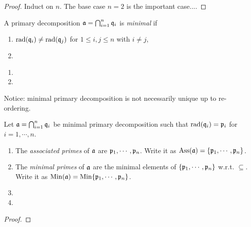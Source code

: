 \begin{proof}
    Induct on $n$. The base case $n = 2$ is the important case....
\end{proof}

\begin{definition}
    A primary decomposition $\mathfrak{a} = \bigcap_{i=1}^{n}\mathfrak{q}_i$ is \emph{minimal} if 
    \begin{enumerate}
        \item $\operatorname{rad}(\mathfrak{q}_i) \neq \operatorname{rad}(\mathfrak{q}_j)$ for $1 \leq i,j \leq n$ with $i \neq j$,
        \item 
    \end{enumerate}
\end{definition}

\begin{example}
    \begin{enumerate}
        \item 
        \item 
    \end{enumerate}
\end{example}

\begin{remark}
    Notice: minimal primary decomposition is not necessarily unique up to re-ordering.
\end{remark}

\begin{definition}
    Let $\mathfrak{a} = \bigcap_{i=1}^{n} \mathfrak{q}_i$ be minimal primary decomposition such that $\operatorname{rad}(\mathfrak{q}_i) = \mathfrak{p}_i$ for $i = 1,\cdots,n$.
    \begin{enumerate}
        \item The \emph{associated primes} of $\mathfrak{a}$ are $\mathfrak{p}_1,\cdots,\mathfrak{p}_n$. Write it as $\operatorname{Ass}(\mathfrak{a}) = \{\mathfrak{p}_1,\cdots,\mathfrak{p}_n\}$.
        \item The \emph{minimal primes} of $\mathfrak{a}$ are the minimal elements of $\{\mathfrak{p}_1,\cdots,\mathfrak{p}_n\}$ w.r.t. $\subseteq$. Write it as $\operatorname{Min}(\mathfrak{a}) = \operatorname{Min}\{\mathfrak{p}_1,\cdots,\mathfrak{p}_n\}$.
        \item 
        \item 
    \end{enumerate}
\end{definition}

\begin{proposition}
\end{proposition}

\begin{proof}
\end{proof}

